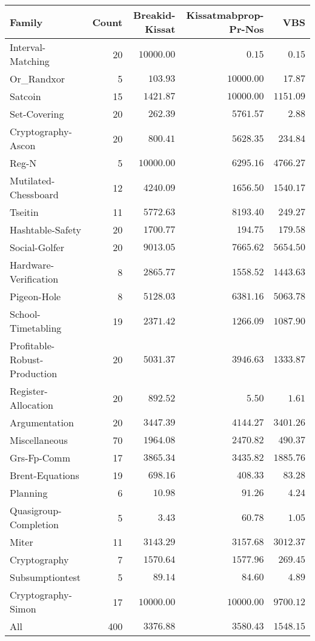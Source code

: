 \begin{tabular}{lr|rr|r}
\toprule
Family & Count & Breakid-Kissat & Kissatmabprop-Pr-Nos & VBS \\
\midrule
Interval-Matching & 20 & $10000.00$ & \bfseries $0.15$ & $0.15$ \\
Or\_Randxor & 5 & \bfseries $103.93$ & $10000.00$ & $17.87$ \\
Satcoin & 15 & \bfseries $1421.87$ & $10000.00$ & $1151.09$ \\
Set-Covering & 20 & \bfseries $262.39$ & $5761.57$ & $2.88$ \\
Cryptography-Ascon & 20 & \bfseries $800.41$ & $5628.35$ & $234.84$ \\
Reg-N & 5 & $10000.00$ & \bfseries $6295.16$ & $4766.27$ \\
Mutilated-Chessboard & 12 & $4240.09$ & \bfseries $1656.50$ & $1540.17$ \\
Tseitin & 11 & \bfseries $5772.63$ & $8193.40$ & $249.27$ \\
Hashtable-Safety & 20 & $1700.77$ & \bfseries $194.75$ & $179.58$ \\
Social-Golfer & 20 & $9013.05$ & \bfseries $7665.62$ & $5654.50$ \\
Hardware-Verification & 8 & $2865.77$ & \bfseries $1558.52$ & $1443.63$ \\
Pigeon-Hole & 8 & \bfseries $5128.03$ & $6381.16$ & $5063.78$ \\
School-Timetabling & 19 & $2371.42$ & \bfseries $1266.09$ & $1087.90$ \\
Profitable-Robust-Production & 20 & $5031.37$ & \bfseries $3946.63$ & $1333.87$ \\
Register-Allocation & 20 & $892.52$ & \bfseries $5.50$ & $1.61$ \\
Argumentation & 20 & \bfseries $3447.39$ & $4144.27$ & $3401.26$ \\
Miscellaneous & 70 & \bfseries $1964.08$ & $2470.82$ & $490.37$ \\
Grs-Fp-Comm & 17 & $3865.34$ & \bfseries $3435.82$ & $1885.76$ \\
Brent-Equations & 19 & $698.16$ & \bfseries $408.33$ & $83.28$ \\
Planning & 6 & \bfseries $10.98$ & $91.26$ & $4.24$ \\
Quasigroup-Completion & 5 & \bfseries $3.43$ & $60.78$ & $1.05$ \\
Miter & 11 & \bfseries $3143.29$ & $3157.68$ & $3012.37$ \\
Cryptography & 7 & \bfseries $1570.64$ & $1577.96$ & $269.45$ \\
Subsumptiontest & 5 & $89.14$ & \bfseries $84.60$ & $4.89$ \\
Cryptography-Simon & 17 & \bfseries $10000.00$ & \bfseries $10000.00$ & $9700.12$ \\
\hline All & 400 & \bfseries $3376.88$ & $3580.43$ & $1548.15$ \\
\bottomrule
\end{tabular}
